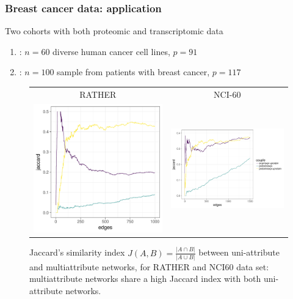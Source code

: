 \begin{frame}
  \frametitle{Breast cancer data: application}

  Two cohorts with both proteomic and transcriptomic data
  \begin{enumerate}
    \item {}: $n=60$ diverse human cancer cell lines, $p=91$
    \item  {}: $n=100$ sample from patients with breast cancer, $p=117$
  \end{enumerate}

\begin{figure}[htbp!]
  \centering
  \begin{tabular}{@{}cc@{}}
   RATHER & NCI-60 \\
    \includegraphics[width=.35\textwidth]{../../chapter/figures/jaccard_RATHER}
  & \includegraphics[width=.5\textwidth]{../../chapter/figures/jaccard_NCI60}
  \end{tabular}
  \caption{Jaccard's similarity index
    $J(A,B) = \frac{\left|A\cap B\right|}{\left|A\cup B\right|}$
    between uni-attribute and multiattribute networks, for RATHER and
    NCI60 data set: multiattribute networks share a high Jaccard
    index with both uni-attribute networks.}
  \label{fig:jaccard}
\end{figure}

\end{frame}

